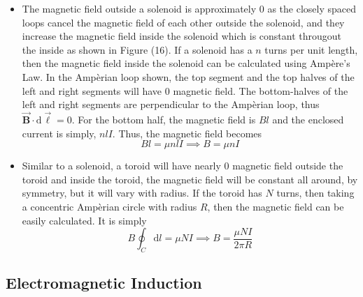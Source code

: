 \documentclass{scrartcl}
\begin{document}
    \begin{itemize}
        \item The magnetic field outside a solenoid is approximately 0 as the closely spaced loops cancel the magnetic field of each other outside the solenoid, and they increase the magnetic field inside the solenoid which is constant througout the inside as shown in Figure (16). If a solenoid has a $n$ turns per unit length, then the magnetic field inside the solenoid can be calculated using Amp\`ere's Law. In the Amp\`erian loop shown, the top segment and the top halves of the left and right segments will have 0 magnetic field. The bottom-halves of the left and right segments are perpendicular to the Amp\`erian loop, thus $\vec{\mathbf B}\cdot\mathrm d\vec{\mathbf\ell}=0$. For the bottom half, the magnetic field is $Bl$ and the enclosed current is simply, $nlI$. Thus, the magnetic field becomes \[Bl=\mu nlI\implies\boxed{B=\mu nI}\]
        \item Similar to a solenoid, a toroid will have nearly 0 magnetic field outside the toroid and inside the toroid, the magnetic field will be constant all around, by symmetry, but it will vary with radius. If the toroid has $N$ turns, then taking a concentric Amp\`erian circle with radius $R$, then the magnetic field can be easily calculated. It is simply \[B\oint_C\mathrm dl=\mu NI\implies\boxed{B=\frac{\mu NI}{2\pi R}}\]
    \end{itemize}
    \subsection{Electromagnetic Induction}
\end{document}
